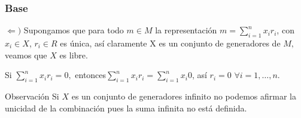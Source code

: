 \documentclass[notes=show]{beamer}%
\newenvironment{Ob}{\begin{block}{Observación}}{\end{block}}
\begin{document}
\begin{frame}%


\bigskip%
\frametitle{Base}%


$\Leftarrow)$ Supongamos que para todo $m\in M$ la representación $m=%
{\displaystyle\sum\limits_{i=1}^{n}}
x_{i}r_{i}$, con $x_{i}\in X$, $r_{i}\in R$ es única, así claramente
X es un conjunto de generadores de $M,$ veamos que $X$ es libre.

Si $%
{\displaystyle\sum\limits_{i=1}^{n}}
x_{i}r_{i}=0,$ entonces$%
{\displaystyle\sum\limits_{i=1}^{n}}
x_{i}r_{i}=%
{\displaystyle\sum\limits_{i=1}^{n}}
x_{i}0$, así $r_{i}=0$ $\forall i=1,\ldots,n$.

\begin{Ob}
\bigskip Si $X$ es un conjunto de generadores infinito no podemos afirmar la
unicidad de la combinación pues la suma infinita no está definida.
\end{Ob}

\bigskip%

\transboxout
\end{frame}%


\bigskip
\end{document}
